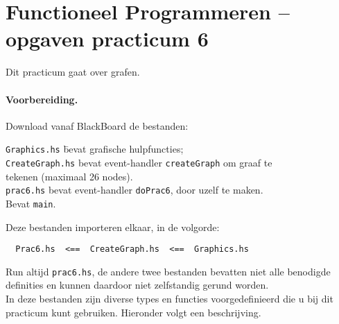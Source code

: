\documentclass[11pt]{article}
\begin{document}
\section*{Functioneel Programmeren -- opgaven practicum 6}
Dit practicum gaat over grafen.


\paragraph{Voorbereiding.}
Download vanaf BlackBoard de bestanden:
\begin{tabbing}
  \hspace{1em}
    \= \verb!Graphics.hs! \hspace{3em}
    \= bevat grafische hulpfuncties;					\\

    \> \verb!CreateGraph.hs!
    \> bevat event-handler \verb!createGraph! om graaf te		\\
    \> \> tekenen (maximaal 26 nodes).	\\
    
    \> \verb!prac6.hs!
    \> bevat event-handler \verb!doPrac6!, door uzelf te maken. \\
    \> \> Bevat \verb!main!.
\end{tabbing}
Deze bestanden importeren elkaar, in de volgorde:
\begin{verbatim}
  Prac6.hs  <==  CreateGraph.hs  <==  Graphics.hs
\end{verbatim}
Run altijd \verb!prac6.hs!, de andere twee bestanden bevatten niet alle
be\-no\-digde definities en kunnen daardoor niet zelfstandig gerund worden.
\\[2ex]
In deze bestanden zijn diverse types en functies voorgedefinieerd die u bij
dit practicum kunt gebruiken.
Hieronder volgt een beschrijving.

\noindent
\end{document}
